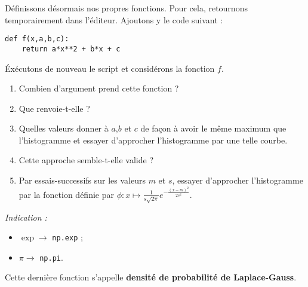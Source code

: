 \documentclass[12pt,french]{article}
\begin{document}
Définissons désormais nos propres fonctions. Pour cela, retournons
temporairement dans l'éditeur. Ajoutons y le code suivant :
\begin{verbatim}
def f(x,a,b,c):
    return a*x**2 + b*x + c
\end{verbatim}

Éxécutons de nouveau le script et considérons la fonction $f$.

\begin{enumerate}[resume*]
  \item Combien d'argument prend cette fonction ?
  \item Que renvoie-t-elle ?
  \item Quelles valeurs donner à $a$,$b$ et $c$ de façon à avoir le même
    maximum que l'histogramme et essayer d'approcher l'histogramme par
    une telle courbe.
  \item Cette approche semble-t-elle valide ?
  \item Par essais-successifs sur les valeurs $m$ et $s$, essayer
    d'approcher l'histogramme par la fonction définie par $\phi : x
    \mapsto \frac1{s\sqrt{2\pi}} e^{-\frac{(x - m)^2}{2s^2}}$.
\end{enumerate}

\emph{Indication :}
\begin{itemize}
  \item $\exp \to$ \texttt{np.exp} ;
  \item $\pi \to$ \texttt{np.pi}.
\end{itemize}

Cette dernière fonction s'appelle \textbf{densité de probabilité de
Laplace-Gauss}.
\end{document}
